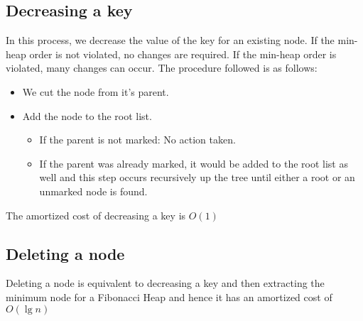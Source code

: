 \subsection{Decreasing a key}
In this process, we decrease the value of the key for an existing node. If the min-heap order is not violated, no changes are required. If the min-heap order is violated, many changes can occur. The procedure followed is as follows:
\begin{itemize}
	\item We cut the node from it's parent.
	\item Add the node to the root list.
	\begin{itemize}
	\item If the parent is not marked: No action taken.
	\item If the parent was already marked, it would be added to the root list as well and this step occurs recursively up the tree until either a root or an unmarked node is found.
	\end{itemize}
\end{itemize}
The amortized cost of decreasing a key is $O(1)$

\subsection{Deleting a node}
Deleting a node is equivalent to decreasing a key and then extracting the minimum node for a Fibonacci Heap and hence it has an amortized cost of $O(\lg{n})$